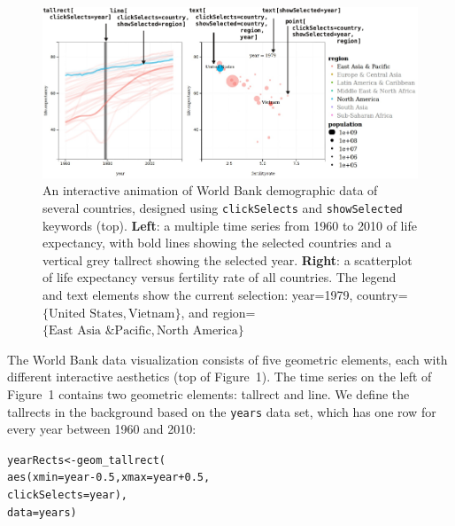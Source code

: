 \documentclass[journal]{vgtc}\usepackage[]{graphicx}\usepackage[]{color}
\makeatletter
\newcommand{\hlnum}[1]{\textcolor[rgb]{0,0,0}{#1}}%
\newcommand{\hlopt}[1]{\textcolor[rgb]{0,0,0}{#1}}%
\newcommand{\hlstd}[1]{\textcolor[rgb]{0,0,0}{#1}}%
\newcommand{\hlkwb}[1]{\textcolor[rgb]{0,0,0}{#1}}%
\newcommand{\hlkwc}[1]{\textcolor[rgb]{0,0,1}{#1}}%
\newcommand{\hlkwd}[1]{\textcolor[rgb]{0,0,0}{#1}}%
\newenvironment{kframe}{%
 \def\at@end@of@kframe{}%
 \ifinner\ifhmode%
  \def\at@end@of@kframe{\end{minipage}}%
  \begin{minipage}{\columnwidth}%
 \fi\fi%
 \def\FrameCommand##1{\hskip\@totalleftmargin \hskip-\fboxsep
 \colorbox{shadecolor}{##1}\hskip-\fboxsep
     \hskip-\linewidth \hskip-\@totalleftmargin \hskip\columnwidth}%
 \MakeFramed {\advance\hsize-\width
   \@totalleftmargin\z@ \linewidth\hsize
   \@setminipage}}%
 {\par\unskip\endMakeFramed%
 \at@end@of@kframe}
\newenvironment{knitrout}{}{} %
\makeatother
\begin{document}
\begin{figure}[b!]
  \centering
  \includegraphics[width=\textwidth]{figure-1}
  \caption{An interactive animation of World Bank demographic data of
    several countries, designed using \texttt{clickSelects} and
    \texttt{showSelected} keywords (top).  \textbf{Left}: a multiple
    time series from 1960 to 2010 of life expectancy, with bold lines
    showing the selected countries and a vertical grey tallrect
    showing the selected year. \textbf{Right}: a scatterplot of life
    expectancy versus fertility rate of all countries. The legend and
    text elements show the current selection: year=1979,
    country=$\{\textrm{United States}, \textrm{Vietnam}\}$, and
    region=$\{\textrm{East Asia \& Pacific}, \textrm{North
      America}\}$}
  \label{fig:1}
\end{figure}

The World Bank data visualization consists of five geometric elements,
each with different interactive aesthetics (top of Figure~1). The time
series on the left of Figure~1 contains two geometric elements:
tallrect and line. We define the tallrects in the background based on
the \texttt{years} data set, which has one row for every year between
1960 and 2010:

\begin{knitrout}
\color{fgcolor}\begin{kframe}
\begin{alltt}
\hlstd{yearRects} \hlkwb{<-} \hlkwd{geom_tallrect}\hlstd{(}
  \hlkwd{aes}\hlstd{(}\hlkwc{xmin}\hlstd{=year}\hlopt{-}\hlnum{0.5}\hlstd{,} \hlkwc{xmax}\hlstd{=year}\hlopt{+}\hlnum{0.5}\hlstd{,}
      \hlkwc{clickSelects}\hlstd{=year),}
  \hlkwc{data}\hlstd{=years)}
\end{alltt}
\end{kframe}
\end{knitrout}
\end{document}
